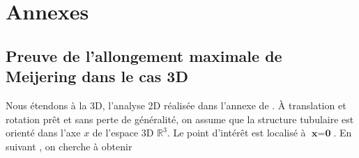 %
\chapter{Annexes}
\label{sec:appendix}

\section{Preuve de l'allongement maximale de Meijering dans le cas 3D}
\label{APP:Proof of Meijering's maximal flatness for 3D case}

\fontsize{8pt}{12pt}\selectfont

Nous étendons à la 3D, l'analyse 2D réalisée dans l'annexe de \cite{Meijering2004_neurite_vesselness}.
À translation et rotation prêt et sans perte de généralité, on assume que la structure tubulaire est orienté dans l'axe $x$ de l'espace 3D $\mathbb R^3$. Le point d'intérêt est localisé à $\textbf{x} = \textbf{0}$.
En suivant \cite{Meijering2004_neurite_vesselness}, on cherche à obtenir  

